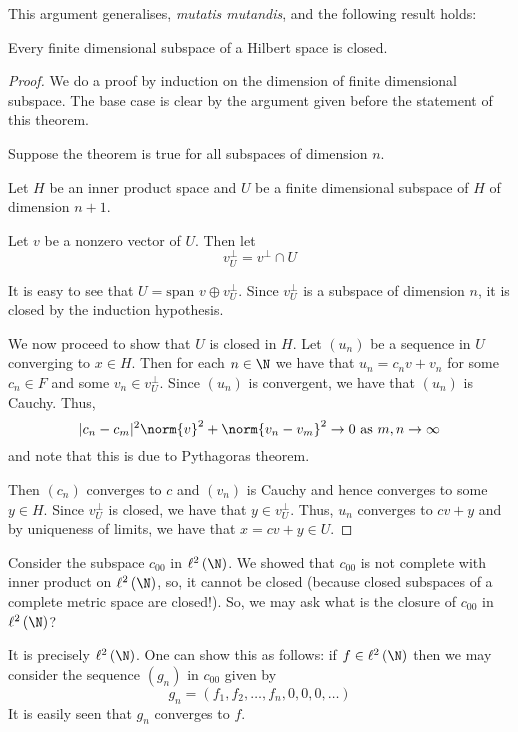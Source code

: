 This argument generalises, \textit{mutatis mutandis}, and the following result holds:
\begin{theorem}
    Every finite dimensional subspace of a Hilbert space is closed.
    \label{thm:fds-are-closed}
\end{theorem}
\begin{proof}
    We do a proof by induction on the dimension of finite dimensional subspace. The base case is clear by the argument given before the statement of this theorem.

    Suppose the theorem is true for all subspaces of dimension $n$.

    Let $H$ be an inner product space and $U$ be a finite dimensional subspace of $H$ of dimension $n+1$.

    Let $v$ be a nonzero vector of $U$. Then let 
    \begin{equation*}
	v_{U}^{\perp} = v^{\perp} \cap U
    \end{equation*}
    
    It is easy to see that $U=\text{span } v \oplus v_{U}^{\perp}$. Since $v_{U}^{\perp}$ is a subspace of dimension $n$, it is closed by the induction hypothesis.

    We now proceed to show that $U$ is closed in $H$. Let $\left( u_{n} \right) $ be a sequence in $U$ converging to $x \in H$. Then for each $n \in \N$ we have that $u_{n} = c_{n} v + v_{n}$ for some $c_{n} \in F$ and some $v_{n} \in v_{U}^{\perp}$.
    Since $\left( u_{n} \right)$ is convergent, we have that $\left( u_{n} \right)$ is Cauchy. Thus, 
    \begin{equation*}
	|c_n - c_m |^2 \norm{v}^{2} + \norm{v_n - v_m}^{2} \to 0 \text { as } m,n \to \infty
    \end{equation*}
    and note that this is due to Pythagoras theorem.

    Then $\left( c_{n} \right)$ converges to $c$ and $\left( v_{n} \right)$ is Cauchy and hence converges to some $y \in H$. Since $v_{U}^{\perp}$ is closed, we have that $y \in v_{U}^{\perp} $. Thus, $u_{n}$ converges to $cv + y$ and by uniqueness of limits, we have that $x=cv+y \in U$.
\end{proof}

\begin{example}
    Consider the subspace $c_{00}$ in $\ell ^{2} \left( \N \right)$. We showed that $c_{00}$ is not complete with inner product on $\ell ^{2} \left( \N \right)$, so, it cannot be closed (because closed subspaces of a complete metric space are closed!). So, we may ask what is the closure of $c_{00}$ in $\ell ^{2} \left( \N \right)$?

    It is precisely $\ell ^{2} \left( \N \right)$. One can show this as follows:
    if $f \in \ell ^{2} \left( \N \right)$ then we may consider the sequence $\left( g_{n} \right)$ in $c_{00}$ given by
    \begin{equation*}
	g_{n} = \left( f_{1} , f_{2} , \ldots , f_{n} , 0 , 0 ,0 , \ldots \right)
    \end{equation*}
    It is easily seen that $g_{n}$ converges to $f$.
\end{example}

